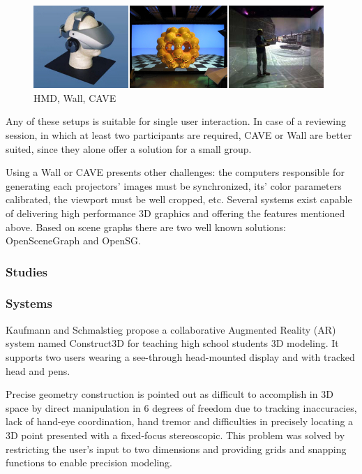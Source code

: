 \begin{figure}[!ht]
	\centering
	\includegraphics[width=11cm]{gfx/hmd-cluster-cave.png}
	\caption{HMD, Wall, CAVE}
	\label{FIG-HMD-CLUSTER-CAVE}
\end{figure}

Any of these setups is suitable for single user interaction.
In case of a reviewing session, in which at least two participants are required,
CAVE or Wall are better suited, since they alone offer a solution for a small group.

Using a Wall or CAVE presents other challenges: the computers responsible for
generating each projectors' images must be synchronized, its' color parameters calibrated,
the viewport must be well cropped, etc.
Several systems exist capable of delivering high performance 3D graphics and
offering the features mentioned above.
Based on scene graphs there are two well known solutions:
OpenSceneGraph\cite{SITE-OSG}
and
OpenSG\cite{SITE-OPENSG}.

\subsubsection{Studies}


\subsubsection{Systems}

Kaufmann and Schmalstieg \cite{VREDUC} propose a collaborative Augmented Reality (AR)
system  named Construct3D for teaching high school students 3D modeling.
It supports two users wearing a see-through head-mounted display and with tracked head and pens.

Precise geometry construction is pointed out as difficult to accomplish in 3D space by direct
manipulation in 6 degrees of freedom due to tracking inaccuracies, lack of hand-eye coordination,
hand tremor and difficulties in precisely locating a 3D point presented with a fixed-focus stereoscopic.
This problem was solved by restricting the user's input to two dimensions and
providing grids and snapping functions to enable precision modeling.

